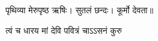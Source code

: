 \centerline{पृथिव्या  मेरुपृष्ठ  ऋषिः।  सुतलं  छन्दः।  कूर्मो  देवता॥}

{त्वं  च  धारय  मां  देवि  पवित्रं  चाऽऽसनं  कुरु}
